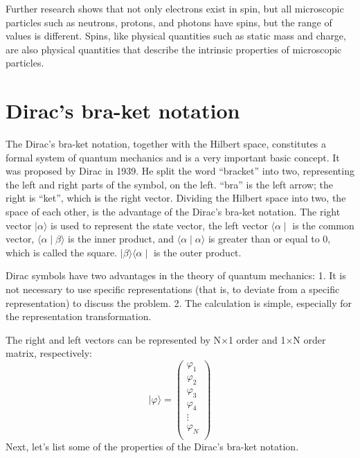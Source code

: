 \documentclass[a4paper]{article}
\begin{document}
    Further research shows that not only electrons exist in spin, but all microscopic particles such as neutrons, protons, and photons have spins, but the range of values is different. Spins, like physical quantities such as static mass and charge, are also physical quantities that describe the intrinsic properties of microscopic particles.
    
    
    
    
    
    
    
    
    
    
    
 

\section{Dirac's bra-ket notation}
    The Dirac's bra-ket notation, together with the Hilbert space, constitutes a formal system of quantum mechanics and is a very important basic concept. It was proposed by Dirac in 1939. He split the word ``bracket'' into two, representing the left and right parts of the symbol, on the left. ``bra'' is the left arrow; the right is ``ket'', which is the right vector.
    Dividing the Hilbert space into two, the space of each other, is the advantage of the Dirac's bra-ket notation. The right vector $\mid\alpha\rangle$ is used to represent the state vector, the left vector $\langle\alpha\mid$ is the common vector, $\langle\alpha\mid\beta\rangle$ is the inner product, and $\langle\alpha\mid\alpha\rangle$ is greater than or equal to 0, which is called the square. $\mid\beta\rangle\langle\alpha\mid$ is the outer product.
\cite{Dirac1939A}
    
    Dirac symbols have two advantages in the theory of quantum mechanics: 1. It is not necessary to use specific representations (that is, to deviate from a specific representation) to discuss the problem. 2. The calculation is simple, especially for the representation transformation.
    
    The right and left vectors can be represented by N$\times$1 order and 1$\times$N order matrix, respectively:
\begin{equation}   
\textbf{$\vert\varphi\rangle$}=
\left( 
             \begin{array}{c}
             \varphi_1\\
             \varphi_2\\
             \varphi_3\\
             \varphi_4\\
             \vdots\\
             \varphi_N\\
             \end{array}
\right) 
\end{equation}
    Next, let's list some of the properties of the Dirac's bra-ket notation.
\end{document}
